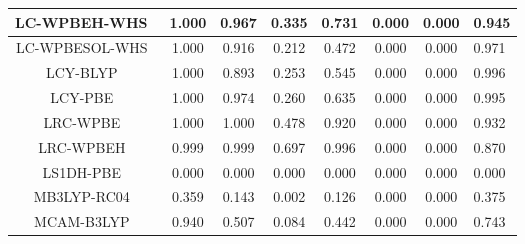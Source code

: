 \begin{tabular}{|c|c|c|c|c|c|c|l|}
       LC-WPBEH-WHS~\cite{Weintraub2009_754,Henderson2008_194105} &                1.000 &                          0.967 &             0.335 &                        0.731 &                0.000 &                0.000 &                       0.945 \\ \hline
     LC-WPBESOL-WHS~\cite{Weintraub2009_754,Henderson2008_194105} &                1.000 &                          0.916 &             0.212 &                        0.472 &                0.000 &                0.000 &                       0.971 \\ \hline
                    LCY-BLYP~\cite{Akinaga2008_348,Seth2013_2286} &                1.000 &                          0.893 &             0.253 &                        0.545 &                0.000 &                0.000 &                       0.996 \\ \hline
                        LCY-PBE~\cite{Seth2012_901,Seth2013_2286} &                1.000 &                          0.974 &             0.260 &                        0.635 &                0.000 &                0.000 &                       0.995 \\ \hline
                              LRC-WPBE~\cite{Rohrdanz2009_054112} &                1.000 &                          1.000 &             0.478 &                        0.920 &                0.000 &                0.000 &                       0.932 \\ \hline
                             LRC-WPBEH~\cite{Rohrdanz2009_054112} &                0.999 &                          0.999 &             0.697 &                        0.996 &                0.000 &                0.000 &                       0.870 \\ \hline
                             LS1DH-PBE~\cite{Toulouse2011_101102} &                0.000 &                          0.000 &             0.000 &                        0.000 &                0.000 &                0.000 &                       0.000 \\ \hline
                              MB3LYP-RC04~\cite{Tognetti2007_381} &                0.359 &                          0.143 &             0.002 &                        0.126 &                0.000 &                0.000 &                       0.375 \\ \hline
                                 MCAM-B3LYP~\cite{Day2006_094103} &                0.940 &                          0.507 &             0.084 &                        0.442 &                0.000 &                0.000 &                       0.743 \\ \hline

\end{tabular}
